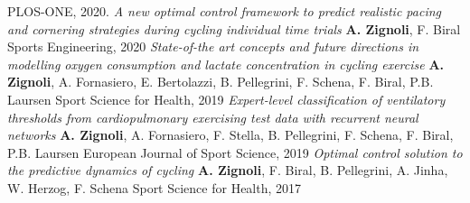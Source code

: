 \documentclass[helvetica,openbib,logo,notitle,flagCMYK,totpages]{europecv}
\begin{document}
\begin{europecv}
{	PLOS-ONE, 2020. 
 \newline
	\newline
	\emph{A new optimal control framework to predict realistic pacing and cornering strategies during cycling individual time trials}\newline 
	\textbf{A. Zignoli}, F. Biral \newline 
	Sports Engineering, 2020 \newline
	\newline
	\emph{State-of-the art concepts and future directions in modelling oxygen consumption and lactate concentration in cycling exercise}\newline 
	\textbf{A. Zignoli}, A. Fornasiero, E. Bertolazzi, B. Pellegrini, F. Schena, F. Biral, P.B. Laursen \newline 
	Sport Science for Health, 2019 \newline
	\newline
	\emph{Expert-level classification of ventilatory thresholds from cardiopulmonary exercising test data with recurrent neural networks}\newline 
	\textbf{A. Zignoli}, A. Fornasiero, F. Stella, B. Pellegrini, F. Schena, F. Biral, P.B. Laursen \newline 
	European Journal of Sport Science, 2019 \newline
	\newline
	\emph{Optimal control solution to the predictive dynamics of cycling}\newline 
	\textbf{A. Zignoli}, F. Biral, B. Pellegrini, A. Jinha, W. Herzog, F. Schena \newline 
	Sport Science for Health, 2017 \newline
	\newline
}
\newpage 
{}
\end{europecv}
\end{document}
